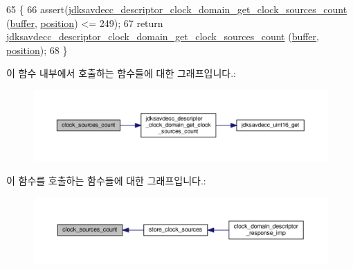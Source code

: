 \begin{DoxyCode}
65 \{
66     assert(\hyperlink{group__descriptor__clock__domain_gab452e3985705f9a639b2557a752186f8}{jdksavdecc\_descriptor\_clock\_domain\_get\_clock\_sources\_count}
      (\hyperlink{classavdecc__lib_1_1descriptor__response__base__imp_a56ed84df35de10bdb65e72b184309497}{buffer}, \hyperlink{classavdecc__lib_1_1descriptor__response__base__imp_a7a04afe5347934be732ec70a70bd0a28}{position}) <= 249);
67     \textcolor{keywordflow}{return} \hyperlink{group__descriptor__clock__domain_gab452e3985705f9a639b2557a752186f8}{jdksavdecc\_descriptor\_clock\_domain\_get\_clock\_sources\_count}
      (\hyperlink{classavdecc__lib_1_1descriptor__response__base__imp_a56ed84df35de10bdb65e72b184309497}{buffer}, \hyperlink{classavdecc__lib_1_1descriptor__response__base__imp_a7a04afe5347934be732ec70a70bd0a28}{position});
68 \}
\end{DoxyCode}


이 함수 내부에서 호출하는 함수들에 대한 그래프입니다.\+:
\nopagebreak
\begin{figure}[H]
\begin{center}
\leavevmode
\includegraphics[width=350pt]{classavdecc__lib_1_1clock__domain__descriptor__response__imp_a334d3137f65e96a7618a66053d07b934_cgraph}
\end{center}
\end{figure}




이 함수를 호출하는 함수들에 대한 그래프입니다.\+:
\nopagebreak
\begin{figure}[H]
\begin{center}
\leavevmode
\includegraphics[width=350pt]{classavdecc__lib_1_1clock__domain__descriptor__response__imp_a334d3137f65e96a7618a66053d07b934_icgraph}
\end{center}
\end{figure}



